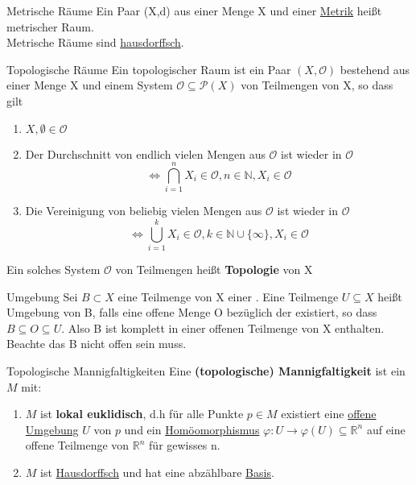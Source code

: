 \begin{titleDef}{Metrische Räume}
\label{MetrischerRaum}
Ein Paar (X,d) aus einer Menge X und einer \hyperref[Metrik]{Metrik} heißt metrischer Raum.\\
Metrische Räume sind \hyperref[hausdorffsch]{hausdorffsch}.
\end{titleDef}

\begin{titleDef}{Topologische Räume}
\label{Topologie}
Ein topologischer Raum ist ein Paar $(X,\mathcal{O})$ bestehend aus einer Menge X und einem System $\mathcal{O}\subseteq\mathcal{P}(X)$ von Teilmengen von X, so dass gilt
\begin{enumerate}
    \item $X,\emptyset\in\mathcal{O}$
    \item Der Durchschnitt von endlich vielen Mengen aus $\mathcal{O}$ ist wieder in $\mathcal{O}$$$\Leftrightarrow\bigcap^n_{i=1}X_i\in\mathcal{O}, n\in\mathbb{N},X_i\in\mathcal{O}$$
    \item Die Vereinigung von beliebig vielen Mengen aus $\mathcal{O}$ ist wieder in $\mathcal{O}$\\$$\Leftrightarrow\bigcup_{i=1}^kX_i\in\mathcal{O}, k\in\mathbb{N}\cup\{\infty\},X_i\in\mathcal{O}$$
\end{enumerate}
Ein solches System $\mathcal{O}$ von Teilmengen heißt \textbf{Topologie} von X 
\end{titleDef}

\begin{titleDef}{Umgebung}
\label{Umgebung}
Sei $B\subset X$ eine Teilmenge von X einer \Toporef \Topo. Eine Teilmenge ${U\subseteq X}$ heißt Umgebung von B, falls eine offene Menge O bezüglich der \Toporef existiert, so dass $B\subseteq O\subseteq U$. Also B ist komplett in einer offenen Teilmenge von X enthalten. Beachte das B nicht offen sein muss.
\end{titleDef}

\begin{titleDef}{Topologische Mannigfaltigkeiten}
\label{Mannigfaltigkeit}
Eine \textbf{(topologische) Mannigfaltigkeit} ist ein \Toporeflong $M$ mit:
\listbsp
\begin{enumerate}
	\item $M$ ist \textbf{lokal euklidisch}, d.h für alle Punkte $p\in M$ existiert eine \hyperref[offen]{offene} \hyperref[Umgebung]{Umgebung} $U$ von $p$ und ein \hyperref[homoemorph]{Homöomorphismus} ${\varphi:U\to \varphi(U)\subseteq\mathbb{R}^n}$ auf eine offene Teilmenge von $\mathbb{R}^n$ für gewisses n.
	\item $M$ ist \hyperref[hausdorffsch]{Hausdorffsch} und hat eine abzählbare \hyperref[basisTopo]{Basis}.
\end{enumerate}
\end{titleDef}

